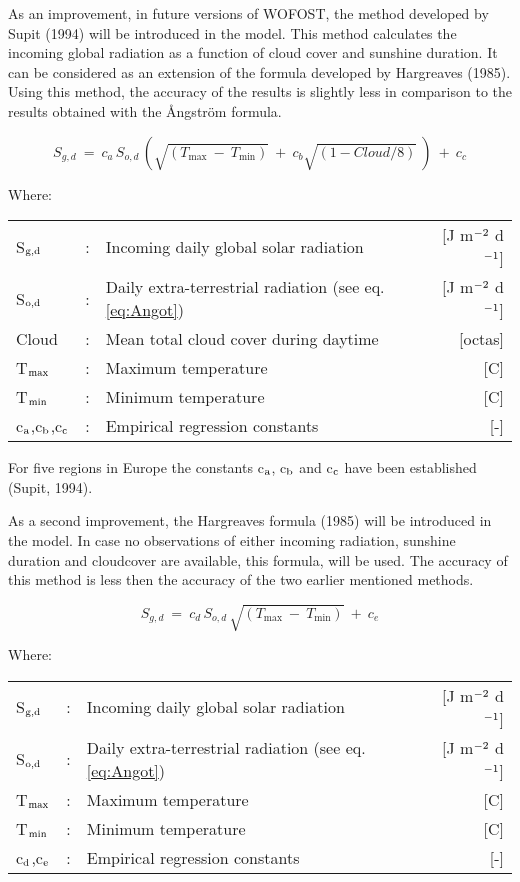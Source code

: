 As an improvement, in future versions of WOFOST, the method developed by Supit
(1994) will be introduced in the model. This method calculates the incoming global
radiation as a function of cloud cover and sunshine duration. It can be considered as an
extension of the formula developed by Hargreaves (1985). 
Using this method, the accuracy of the results is slightly less in comparison to 
the results obtained with the \AA ngstr\"{o}m formula.

\begin{equation}
S _{g,d} ~=~ c _{a} \, S _{o,d} \, (\sqrt{(T _{\max} ~-~T _{\min} )} ~+~ 
c _{b} \sqrt{(1-{Cloud/8})} ~) ~+~c _{c} 
\end{equation}

Where:\\[5pt]
\begin{tabularx}{\textwidth}{llXr}
	S$_{{\rm g,d}}$ &:& Incoming daily global solar radiation  & [J m$^{{\rm -2}}$ d$^{{\rm -1}}$]\\
	S$_{{\rm o,d}}$ &:& Daily extra-terrestrial radiation (see eq. \ref{eq:Angot})  & 
	[J m$^{{\rm -2}}$ d$^{{\rm -1}}$]\\
	Cloud &:& Mean total cloud cover during daytime  & [octas]\\
	T$_{{\rm max}}$ &:& Maximum temperature  & [\degrees C]\\
	T$_{{\rm min}}$ &:& Minimum temperature  & [\degrees C]\\
	c$_{{\rm a}}$,c$_{{\rm b}}$,c$_{{\rm c}}$ &:& Empirical regression constants   & [-]
\end{tabularx}

For five regions in Europe the constants c$_{{\rm a}}$, c$_{{\rm b}}$ and c$_{{\rm c}}$ 
have been established (Supit, 1994).

As a second improvement, the Hargreaves formula (1985) will be introduced in the
model. In case no observations of either incoming radiation, sunshine duration and
cloudcover are available, this formula, will be used. The accuracy of this method is less
then the accuracy of the two earlier mentioned methods.

\begin{equation}
S _{g,d} ~=~ c _{d} \, S _{o,d} \, \sqrt{(T _{\max} ~-~T _{\min} )} ~+~c _{e} 
\end{equation}

Where:\\[5pt]
\begin{tabularx}{\textwidth}{llXr}
	S$_{{\rm g,d}}$ &:& Incoming daily global solar radiation  & [J m$^{{\rm -2}}$ d$^{{\rm -1}}$]\\
	S$_{{\rm o,d}}$ &:& Daily extra-terrestrial radiation (see eq. \ref{eq:Angot})  & 
	[J m$^{{\rm -2}}$ d$^{{\rm -1}}$]\\
	T$_{{\rm max}}$ &:& Maximum temperature  & [\degrees C]\\
	T$_{{\rm min}}$ &:& Minimum temperature  & [\degrees C]\\
	c$_{{\rm d}}$,c$_{{\rm e}}$  &:& Empirical regression constants  & [-]\\
\end{tabularx}

